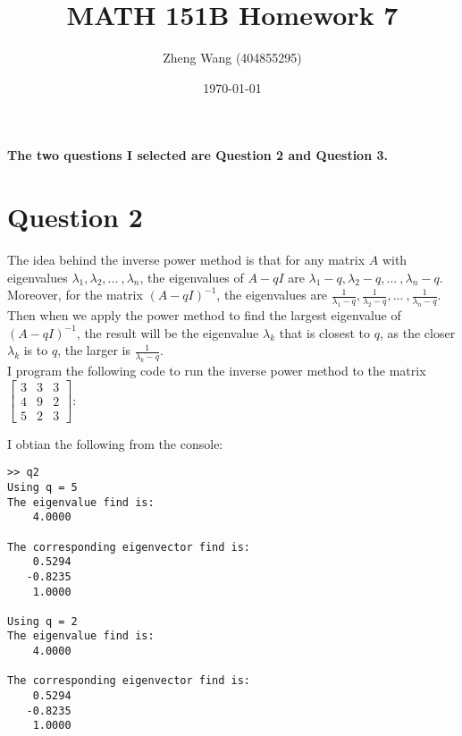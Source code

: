 \documentclass[11pt]{article}
\author{Zheng Wang (404855295)}
\date{\today}
\title{MATH 151B Homework 7}
\begin{document}

\maketitle

\textbf{The two questions I selected are Question 2 and Question 3.}\\
\section*{Question 2}
The idea behind the inverse power method is that for any matrix $ A $ with eigenvalues $ \lambda_1, \lambda_2,...\ , \lambda_n $, the eigenvalues of $ A -q I$ are $ \lambda_1-q, \lambda_2-q,...\ , \lambda_n-q $. Moreover, for the matrix $ (A-qI)^{-1}$, the eigenvalues are $ \displaystyle \frac{1}{\lambda_1-q}, \frac{1}{\lambda_2-q},...\ ,  \frac{1}{\lambda_n-q} $.
Then when we apply the power method to find the largest eigenvalue of $ (A-q I)^{-1} $, the result will be the eigenvalue $\lambda_k$ that is closest to $q$, as the closer $\lambda_k$ is to $q$, the larger is $\displaystyle \frac{1}{\lambda_k - q}$.\\
I program the following code to run the inverse power method to the matrix $\begin{bmatrix}
3 & 3 & 3\\
4 & 9 & 2\\
5 & 2 & 3
\end{bmatrix}$:



I obtian the following from the console:
\begin{verbatim}
>> q2
Using q = 5
The eigenvalue find is:
    4.0000

The corresponding eigenvector find is:
    0.5294
   -0.8235
    1.0000

Using q = 2
The eigenvalue find is:
    4.0000

The corresponding eigenvector find is:
    0.5294
   -0.8235
    1.0000
\end{verbatim}
\end{document}
